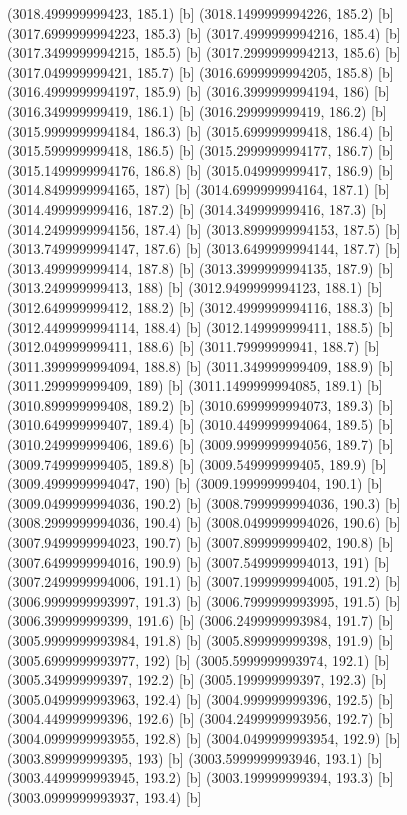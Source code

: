 {{{(3018.499999999423, 185.1) [b] 
(3018.1499999994226, 185.2) [b] 
(3017.6999999994223, 185.3) [b] 
(3017.4999999994216, 185.4) [b] 
(3017.3499999994215, 185.5) [b] 
(3017.2999999994213, 185.6) [b] 
(3017.049999999421, 185.7) [b] 
(3016.6999999994205, 185.8) [b] 
(3016.4999999994197, 185.9) [b] 
(3016.3999999994194, 186) [b] 
(3016.349999999419, 186.1) [b] 
(3016.299999999419, 186.2) [b] 
(3015.9999999994184, 186.3) [b] 
(3015.699999999418, 186.4) [b] 
(3015.599999999418, 186.5) [b] 
(3015.2999999994177, 186.7) [b] 
(3015.1499999994176, 186.8) [b] 
(3015.049999999417, 186.9) [b] 
(3014.8499999994165, 187) [b] 
(3014.6999999994164, 187.1) [b] 
(3014.499999999416, 187.2) [b] 
(3014.349999999416, 187.3) [b] 
(3014.2499999994156, 187.4) [b] 
(3013.8999999994153, 187.5) [b] 
(3013.7499999994147, 187.6) [b] 
(3013.6499999994144, 187.7) [b] 
(3013.499999999414, 187.8) [b] 
(3013.3999999994135, 187.9) [b] 
(3013.249999999413, 188) [b] 
(3012.9499999994123, 188.1) [b] 
(3012.649999999412, 188.2) [b] 
(3012.4999999994116, 188.3) [b] 
(3012.4499999994114, 188.4) [b] 
(3012.149999999411, 188.5) [b] 
(3012.049999999411, 188.6) [b] 
(3011.79999999941, 188.7) [b] 
(3011.3999999994094, 188.8) [b] 
(3011.349999999409, 188.9) [b] 
(3011.299999999409, 189) [b] 
(3011.1499999994085, 189.1) [b] 
(3010.899999999408, 189.2) [b] 
(3010.6999999994073, 189.3) [b] 
(3010.649999999407, 189.4) [b] 
(3010.4499999994064, 189.5) [b] 
(3010.249999999406, 189.6) [b] 
(3009.9999999994056, 189.7) [b] 
(3009.749999999405, 189.8) [b] 
(3009.549999999405, 189.9) [b] 
(3009.4999999994047, 190) [b] 
(3009.199999999404, 190.1) [b] 
(3009.0499999994036, 190.2) [b] 
(3008.7999999994036, 190.3) [b] 
(3008.2999999994036, 190.4) [b] 
(3008.0499999994026, 190.6) [b] 
(3007.9499999994023, 190.7) [b] 
(3007.899999999402, 190.8) [b] 
(3007.6499999994016, 190.9) [b] 
(3007.5499999994013, 191) [b] 
(3007.2499999994006, 191.1) [b] 
(3007.1999999994005, 191.2) [b] 
(3006.9999999993997, 191.3) [b] 
(3006.7999999993995, 191.5) [b] 
(3006.399999999399, 191.6) [b] 
(3006.2499999993984, 191.7) [b] 
(3005.9999999993984, 191.8) [b] 
(3005.899999999398, 191.9) [b] 
(3005.6999999993977, 192) [b] 
(3005.5999999993974, 192.1) [b] 
(3005.349999999397, 192.2) [b] 
(3005.199999999397, 192.3) [b] 
(3005.0499999993963, 192.4) [b] 
(3004.999999999396, 192.5) [b] 
(3004.449999999396, 192.6) [b] 
(3004.2499999993956, 192.7) [b] 
(3004.0999999993955, 192.8) [b] 
(3004.0499999993954, 192.9) [b] 
(3003.899999999395, 193) [b] 
(3003.5999999993946, 193.1) [b] 
(3003.4499999993945, 193.2) [b] 
(3003.199999999394, 193.3) [b] 
(3003.0999999993937, 193.4) [b] 
}}}
